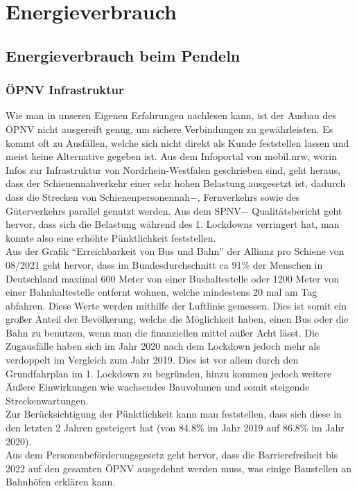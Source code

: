\documentclass[a4paper,12pt]{scrartcl}
\begin{document}
\section{Energieverbrauch}
\subsection{Energieverbrauch beim Pendeln}
\subsubsection{ÖPNV Infrastruktur}
Wie man in unseren Eigenen Erfahrungen nachlesen kann, ist der Ausbau des ÖPNV nicht ausgereift genug, um sichere Verbindungen zu gewährleisten. Es kommt oft zu Ausfällen, welche sich nicht direkt als Kunde feststellen lassen und meist keine Alternative gegeben ist. Aus dem Infoportal von mobil.nrw, worin Infos zur Infrastruktur von Nordrhein-Westfalen geschrieben sind, geht heraus, dass der Schienennahverkehr einer sehr hohen Belastung ausgesetzt ist, dadurch dass die Strecken von Schienenpersonennah$-$, Fernverkehrs sowie des Güterverkehrs parallel genutzt werden. Aus dem SPNV$-$ Qualitätsbericht geht hervor, dass sich die Belastung während des 1. Lockdowns verringert hat, man konnte also eine erhöhte Pünktlichkeit feststellen. \\
Aus der Grafik ``Erreichbarkeit von Bus und Bahn'' der Allianz pro Schiene von 08/2021 geht hervor, dass im Bundesdurchschnitt ca 91\% der Menschen in Deutschland maximal 600 Meter von einer Bushaltestelle oder 1200 Meter von einer Bahnhaltestelle entfernt wohnen, welche mindestens 20 mal am Tag abfahren. Diese Werte werden mithilfe der Luftlinie gemessen. Dies ist somit ein großer Anteil der Bevölkerung, welche die Möglichkeit haben, einen Bus oder die Bahn zu benutzen, wenn man die finanziellen mittel außer Acht lässt. Die Zugausfälle haben sich im Jahr 2020 nach dem Lockdown jedoch mehr als verdoppelt im Vergleich zum Jahr 2019. Dies ist vor allem durch den Grundfahrplan im 1. Lockdown zu begründen, hinzu kommen jedoch weitere Äußere Einwirkungen wie wachsendes Bauvolumen und somit steigende Streckenwartungen.\\
Zur Berücksichtigung der Pünktlichkeit kann man feststellen, dass sich diese in den letzten 2 Jahren gesteigert hat (von 84.8\% im Jahr 2019 auf 86.8\% im Jahr 2020).\\
Aus dem Personenbeförderungsgesetz geht hervor, dass die Barrierefreiheit bis 2022 auf den gesamten ÖPNV ausgedehnt werden muss, was einige Baustellen an Bahnhöfen erklären kann.
\end{document}
